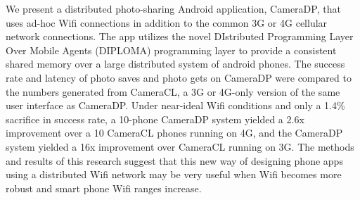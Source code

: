 We present a distributed photo-sharing Android application, CameraDP, that uses ad-hoc Wifi connections in addition to the common 3G or 4G cellular network connections. The app utilizes the novel DIstributed Programming Layer Over Mobile Agents (DIPLOMA) programming layer to provide a consistent shared memory over a large distributed system of android phones. The success rate and latency of photo saves and photo gets on CameraDP were compared to the numbers generated from CameraCL, a 3G or 4G-only version of the same user interface as CameraDP. Under near-ideal Wifi conditions and only a 1.4\% sacrifice in success rate, a 10-phone CameraDP system yielded a 2.6x improvement over a 10 CameraCL phones running on 4G, and the CameraDP system yielded a 16x improvement over CameraCL running on 3G. The methods and results of this research suggest that this new way of designing phone apps using a distributed Wifi network may be very useful when Wifi becomes more robust and smart phone Wifi ranges increase.

